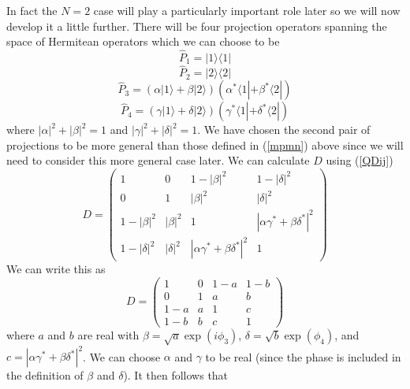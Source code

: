 \documentclass[12pt]{article}
\begin{document}
In fact the $N=2$ case will play a particularly important role later so
we will now develop it a little further.  There will be four projection
operators spanning the space of Hermitean operators which we can choose
to be
\begin{equation}
\hat{P}_1=|1\rangle\langle 1|
\end{equation}
\begin{equation}
\hat{P}_2=|2\rangle\langle 2|
\end{equation}
\begin{equation}
\hat{P}_3=(\alpha|1\rangle+\beta|2\rangle)
(\alpha^*\langle 1|+\beta^*\langle 2|)
\end{equation}
\begin{equation}
\hat{P}_4=(\gamma|1\rangle+\delta|2\rangle)
(\gamma^*\langle 1|+\delta^*\langle 2|)
\end{equation}
where $|\alpha|^2+|\beta|^2=1$ and $|\gamma|^2+|\delta|^2=1$.
We have chosen the second pair of projections to be more general than
those defined in (\ref{mpmn}) above since we will need to consider this
more general case later.
We can calculate $D$ using (\ref{QDij})
\begin{equation}
D=\left( \begin{matrix}
       1 & 0 & 1-|\beta|^2 & 1-|\delta|^2 \\
       0 & 1 &  |\beta|^2 &   |\delta|^2  \\
     1-|\beta|^2 & |\beta|^2 & 1 & |\alpha\gamma^* +\beta\delta^*|^2 \\
     1-|\delta|^2 & |\delta|^2 & |\alpha\gamma^* +\beta\delta^*|^2 & 1
   \end{matrix} \right)
\end{equation}
We can write this as
\begin{equation}\label{QtwodD}
D=\left( \begin{array}{cccc} 1 &  0 &  1-a & 1-b \\
                             0 &  1 &   a  &  b  \\
                             1-a&  a &  1 &  c  \\
                            1-b &  b &  c &  1   \end{array} \right)
\end{equation}
where $a$ and $b$ are real with $\beta=\sqrt{a} \exp(i\phi_3)$,
$\delta=\sqrt{b} \exp(\phi_4)$, and
$c=|\alpha\gamma^* +\beta\delta^*|^2$. We can choose $\alpha$ and
$\gamma$ to be real (since the phase is included in the definition of
$\beta$ and $\delta$).  It then follows that
\end{document}
